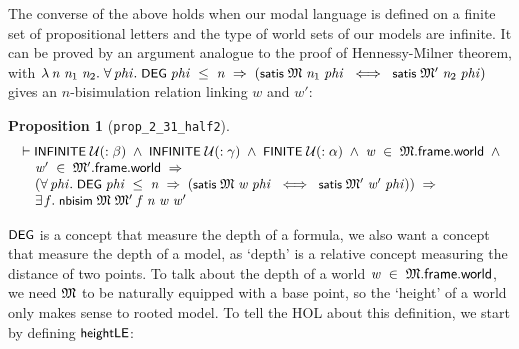 \documentclass[letterpaper]{article}
\newtheorem{prop}{Proposition}
\renewcommand{\HOLConst}[1]{{\textsf{\upshape\small #1}}}
\renewcommand{\HOLinline}[1]{\ensuremath{#1}}
\newenvironment{holmath}{\begin{displaymath}\begin{array}{l}}{\end{array}\end{displaymath}\ignorespacesafterend}
\begin{document}
The converse of the above holds when our modal language is defined on a finite set of propositional letters and the type of world sets of our models are infinite. It can be proved by an argument analogue to the proof of Hennessy-Milner theorem, with \HOLinline{\HOLTokenLambda{}\HOLBoundVar{n}\;\HOLBoundVar{n\sb{\mathrm{1}}}\;\HOLBoundVar{n\sb{\mathrm{2}}}.\;\HOLSymConst{\HOLTokenForall{}}\HOLBoundVar{phi}.\;\HOLConst{DEG}\;\HOLBoundVar{phi}\;\HOLSymConst{\HOLTokenLeq{}}\;\HOLBoundVar{n}\;\HOLSymConst{\HOLTokenImp{}}\;(\HOLConst{satis}\;\HOLFreeVar{\ensuremath{\mathfrak{M}}}\;\HOLBoundVar{n\sb{\mathrm{1}}}\;\HOLBoundVar{phi}\;\HOLSymConst{\HOLTokenEquiv{}}\;\HOLConst{satis}\;\HOLFreeVar{\ensuremath{\mathfrak{M}'}}\;\HOLBoundVar{n\sb{\mathrm{2}}}\;\HOLBoundVar{phi})} gives an $n$-bisimulation relation linking $w$ and $w'$:
\begin{prop}[\texttt{prop_2_31_half2}]
\begin{holmath}
  \ensuremath{\HOLTokenTurnstile}\HOLConst{INFINITE}\;\ensuremath{\cal{U}}(:\ensuremath{\beta})\;\HOLSymConst{\HOLTokenConj{}}\;\HOLConst{INFINITE}\;\ensuremath{\cal{U}}(:\ensuremath{\gamma})\;\HOLSymConst{\HOLTokenConj{}}\;\HOLConst{FINITE}\;\ensuremath{\cal{U}}(:\ensuremath{\alpha})\;\HOLSymConst{\HOLTokenConj{}}\;\HOLFreeVar{w}\;\HOLSymConst{\HOLTokenIn{}}\;\HOLFreeVar{\ensuremath{\mathfrak{M}}}.\HOLFieldName{frame}.\HOLFieldName{world}\;\HOLSymConst{\HOLTokenConj{}}\\
\;\;\;\;\;\HOLFreeVar{w\sp{\prime}}\;\HOLSymConst{\HOLTokenIn{}}\;\HOLFreeVar{\ensuremath{\mathfrak{M}'}}.\HOLFieldName{frame}.\HOLFieldName{world}\;\HOLSymConst{\HOLTokenImp{}}\\
\;\;\;\;\;(\HOLSymConst{\HOLTokenForall{}}\HOLBoundVar{phi}.\;\HOLConst{DEG}\;\HOLBoundVar{phi}\;\HOLSymConst{\HOLTokenLeq{}}\;\HOLFreeVar{n}\;\HOLSymConst{\HOLTokenImp{}}\;(\HOLConst{satis}\;\HOLFreeVar{\ensuremath{\mathfrak{M}}}\;\HOLFreeVar{w}\;\HOLBoundVar{phi}\;\HOLSymConst{\HOLTokenEquiv{}}\;\HOLConst{satis}\;\HOLFreeVar{\ensuremath{\mathfrak{M}'}}\;\HOLFreeVar{w\sp{\prime}}\;\HOLBoundVar{phi}))\;\HOLSymConst{\HOLTokenImp{}}\\
\;\;\;\;\;\HOLSymConst{\HOLTokenExists{}}\HOLBoundVar{f}.\;\HOLConst{nbisim}\;\HOLFreeVar{\ensuremath{\mathfrak{M}}}\;\HOLFreeVar{\ensuremath{\mathfrak{M}'}}\;\HOLBoundVar{f}\;\HOLFreeVar{n}\;\HOLFreeVar{w}\;\HOLFreeVar{w\sp{\prime}}
\end{holmath} 
\end{prop}

\HOLinline{\HOLConst{DEG}} is a concept that measure the depth of a formula, we also want a concept that measure the depth of a model, as `depth' is a relative concept measuring the distance of two points. To talk about the depth of a world \HOLinline{\HOLFreeVar{w}\;\HOLSymConst{\HOLTokenIn{}}\;\HOLFreeVar{\ensuremath{\mathfrak{M}}}.\HOLFieldName{frame}.\HOLFieldName{world}}, we need \HOLinline{\HOLFreeVar{\ensuremath{\mathfrak{M}}}} to be naturally equipped with a base point, so the `height' of a world only makes sense to rooted model. To tell the HOL about this definition, we start by defining \HOLinline{\HOLConst{heightLE}}:
\end{document}
